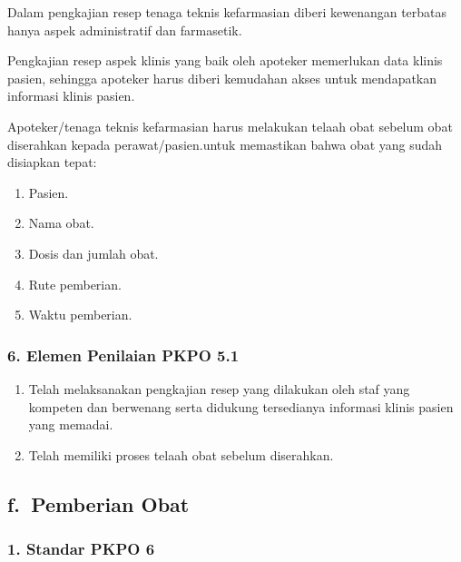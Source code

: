 \documentclass[
]{book}
\providecommand{\tightlist}{%
  \setlength{\itemsep}{0pt}\setlength{\parskip}{0pt}}
\begin{document}
Dalam pengkajian resep tenaga teknis kefarmasian diberi kewenangan terbatas hanya aspek administratif dan farmasetik.

Pengkajian resep aspek klinis yang baik oleh apoteker memerlukan data klinis pasien, sehingga apoteker harus diberi kemudahan akses untuk mendapatkan informasi klinis pasien.

Apoteker/tenaga teknis kefarmasian harus melakukan telaah obat sebelum obat diserahkan kepada perawat/pasien.untuk memastikan bahwa obat yang sudah disiapkan tepat:

\begin{enumerate}
\def\labelenumi{\alph{enumi}.}
\tightlist
\item
  Pasien.
\item
  Nama obat.
\item
  Dosis dan jumlah obat.
\item
  Rute pemberian.
\item
  Waktu pemberian.
\end{enumerate}

\hypertarget{elemen-penilaian-pkpo-5.1}{%
\subsubsection*{6. Elemen Penilaian PKPO 5.1}\label{elemen-penilaian-pkpo-5.1}}

\begin{enumerate}
\def\labelenumi{\alph{enumi}.}
\tightlist
\item
  Telah melaksanakan pengkajian resep yang dilakukan oleh staf yang kompeten dan berwenang serta didukung tersedianya informasi klinis pasien yang memadai.
\item
  Telah memiliki proses telaah obat sebelum diserahkan.
\end{enumerate}

\hypertarget{f.-pemberian-obat}{%
\subsection*{f.~Pemberian Obat}\label{f.-pemberian-obat}}

\hypertarget{standar-pkpo-6}{%
\subsubsection*{1. Standar PKPO 6}\label{standar-pkpo-6}}
\end{document}
